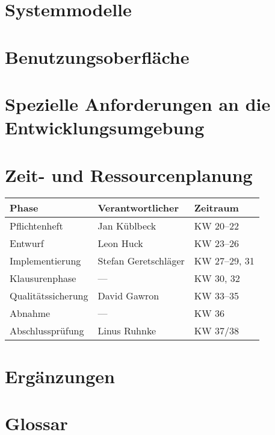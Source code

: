 \documentclass[parskip=full]{scrartcl}
\begin{document}
\section{Systemmodelle}

\section{Benutzungsoberfläche}

\section{Spezielle Anforderungen an die Entwicklungsumgebung}

\section{Zeit- und Ressourcenplanung}

\begin{tabular}{| l | l | l |}
	\hline
	\textbf{Phase} & \textbf{Verantwortlicher} & \textbf{Zeitraum} \\ \hline
	Pflichtenheft & Jan Küblbeck & KW 20–22 \\
	Entwurf & Leon Huck & KW 23–26 \\
	Implementierung & Stefan Geretschläger & KW 27–29, 31 \\
	Klausurenphase & — & KW 30, 32 \\
	Qualitätssicherung & David Gawron & KW 33–35 \\
	Abnahme & — & KW 36 \\
	Abschlussprüfung & Linus Ruhnke & KW 37/38 \\
	\hline
\end{tabular}

\section{Ergänzungen}

\section{Glossar}

\renewcommand*{\glossarysection}[2][]{}	%
\printnoidxglossaries				%
\end{document}
